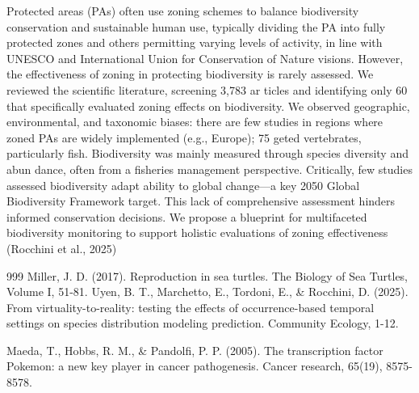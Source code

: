 \documentclass[12]{article}
\begin{document}
Protected areas (PAs) often use zoning schemes to balance biodiversity conservation and sustainable human 
use, typically dividing the PA into fully protected zones and others permitting varying \citep{Maeda2005}levels of activity, in line 
with UNESCO and International Union for Conservation of Nature visions. However, the effectiveness of 
zoning in protecting biodiversity is rarely assessed. We reviewed the scientific literature, screening 3,783 ar
ticles and identifying only 60 that specifically evaluated zoning effects on biodiversity. We observed \citep{Miller2017}
geographic, environmental, and taxonomic biases: there are few studies in regions where zoned PAs are 
widely implemented (e.g., Europe); 75%
geted vertebrates, particularly fish. Biodiversity was mainly measured through species diversity and abun
dance, often from a fisheries management perspective. Critically, few studies assessed biodiversity adapt
ability to global change—a key 2050 Global Biodiversity Framework target. This lack of comprehensive 
assessment hinders informed conservation decisions. We propose a blueprint for multifaceted biodiversity 
monitoring to support holistic evaluations of zoning effectiveness
(Rocchini et al., 2025) %
\citep{Uyen2025}


\begin{thebibliography}{999}
Miller, J. D. (2017). Reproduction in sea turtles. The Biology of Sea Turtles, Volume I, 51-81.
%
Uyen, B. T., Marchetto, E., Tordoni, E., \& Rocchini, D. (2025). From virtuality-to-reality: testing the effects of occurrence-based temporal settings on species distribution modeling prediction. Community Ecology, 1-12.

Maeda, T., Hobbs, R. M., \& Pandolfi, P. P. (2005). The transcription factor Pokemon: a new key player in cancer pathogenesis. Cancer research, 65(19), 8575-8578.
\end{thebibliography}
\end{document}
